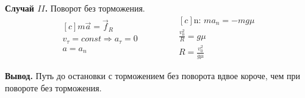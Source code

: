 \documentclass[a5paper,10pt]{article}\usepackage[usenames,dvipsnames]{color}\usepackage{extsizes,cmap,graphicx,misccorr,indentfirst,makecell,multirow,ulem,geometry,amssymb,amsfonts,amsmath,amsthm,titlesec,float,fancyhdr,wrapfig,tikz}\usepackage[T2A]{fontenc}\usepackage[utf8x]{inputenc}\usepackage[english, russian]{babel}\usetikzlibrary{decorations.pathreplacing,decorations.pathmorphing,patterns,calc,scopes,arrows,through}\graphicspath{{img/}}\linespread{1.3}\frenchspacing\geometry{left=1cm, right=1cm, top=2cm, bottom=1cm, bindingoffset=0cm}\pagestyle{fancy}\fancyhead{}\fancyhead[R]{Сарафанов Ф.Г.}
\begin{document}
\textbf{Случай $II$.} Поворот без торможения.
\begin{equation*}
    \begin{aligned}[c]
	m\vec{a}=\vec{f}_R\\
	v_\tau=const \Longrightarrow a_\tau=0 \\ a=a_n\\
    \end{aligned}
        \qquad\qquad
    \begin{aligned}[c]
	\text{n: } ma_n=-mg\mu\\
	\frac{v_0^2}{R}=g\mu\\
	R=\frac{v_0^2}{g\mu}
    \end{aligned}
\end{equation*}

\textbf{Вывод.} Путь до остановки с торможением без поворота  вдвое короче, чем при повороте без торможения.
\end{document}
